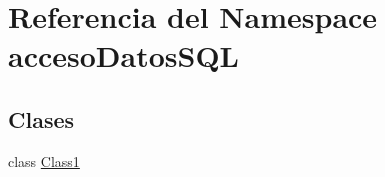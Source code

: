 \hypertarget{namespaceacceso_datos_s_q_l}{}\section{Referencia del Namespace acceso\+Datos\+S\+QL}
\label{namespaceacceso_datos_s_q_l}
\subsection*{Clases}
\begin{DoxyCompactItemize}
\item 
class \mbox{\hyperlink{classacceso_datos_s_q_l_1_1_class1}{Class1}}
\end{DoxyCompactItemize}

